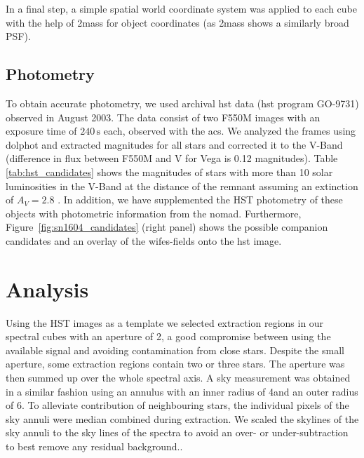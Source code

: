 \documentclass[preprint2]{aastex}
\begin{document}
In a final step, a simple spatial world coordinate system was applied to each cube with the help of \gls{2mass} for object coordinates (as \gls{2mass} shows a similarly broad PSF).



\subsection{Photometry}

To obtain accurate photometry, we used archival \gls{hst} data (\gls{hst} program GO-9731) observed in August 2003. The data consist of two F550M images with an exposure time of $240\,\textrm{s}$ each, observed with the \gls{acs}. We analyzed the frames using \gls{dolphot} and extracted magnitudes for all stars and corrected it to the V-Band (difference in flux between F550M and V for Vega is 0.12 magnitudes). Table \ref{tab:hst_candidates} shows the magnitudes of stars with more than 10 solar luminosities in the V-Band at the distance of the remnant assuming an extinction of $A_V = 2.8$ \citep{2007ApJ...668L.135R}. In addition, we have supplemented the HST photometry of these objects with photometric information from the \gls{nomad}. Furthermore, Figure~\ref{fig:sn1604_candidates}  (right panel) shows the possible companion candidates and an overlay of the \gls{wifes}-fields onto the \gls{hst} image. 







\section{Analysis}
\label{sec:analysis}
 

Using the HST images as a template we selected extraction regions in our spectral cubes with an aperture of 2\arcsec, a good compromise between using the available signal and avoiding contamination from close stars. Despite the small aperture, some extraction regions contain two or three stars. The aperture was then summed up over the whole spectral axis. A sky measurement was obtained in a similar fashion using an annulus with an inner radius of 4\arcsec and an outer radius of 6\arcsec. To alleviate contribution of neighbouring stars,  the individual pixels of the sky annuli were median combined during extraction. We scaled the skylines of the sky annuli to the sky lines of the spectra to avoid an over- or under-subtraction to best remove any residual background..
\end{document}
